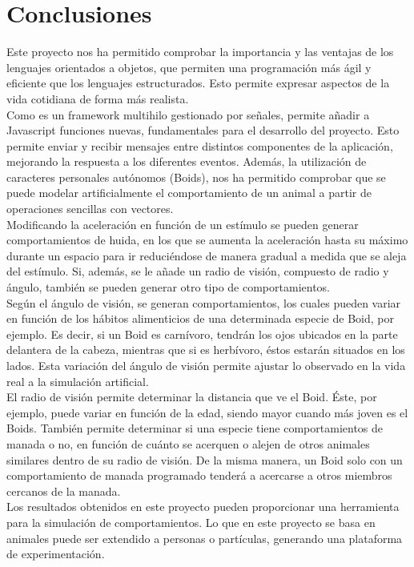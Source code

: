 \section{Conclusiones}
\label{chap:conclusiones}

Este proyecto nos ha permitido comprobar la importancia y las ventajas de los lenguajes orientados a objetos, que permiten una programación más 
ágil y eficiente que los lenguajes estructurados. Esto permite expresar aspectos de la vida cotidiana de forma más realista.\\

Como \lluvia{} es un framework multihilo gestionado por señales, permite añadir a Javascript funciones nuevas, fundamentales para el desarrollo del proyecto. 
Esto permite enviar y recibir mensajes entre distintos componentes de la aplicación, mejorando la respuesta a los diferentes eventos. Además, la utilización de caracteres 
personales autónomos (Boids), nos ha permitido comprobar que se puede modelar artificialmente el comportamiento de un animal a partir de 
operaciones sencillas con vectores.\\

Modificando la aceleración en función de un estímulo se pueden generar comportamientos de huida, en los que se aumenta la aceleración hasta su 
máximo durante un espacio para ir reduciéndose de manera gradual a medida que se aleja del estímulo.
Si, además, se le añade un radio de visión, compuesto de radio y ángulo, también se pueden generar otro tipo de comportamientos.\\

Según el ángulo de visión, se generan comportamientos, los cuales pueden variar en función de los hábitos alimenticios de 
una determinada especie de Boid, por ejemplo. Es decir, si un Boid es carnívoro, tendrán los ojos ubicados en la parte delantera de la cabeza, mientras 
que si es herbívoro, éstos estarán situados en los lados. Esta variación del ángulo de visión permite ajustar lo observado en la vida real a la 
simulación artificial.\\

El radio de visión permite determinar la distancia que ve el Boid. Éste, por ejemplo, puede variar en función de la edad, siendo mayor cuando
más joven es el Boids. También permite determinar si una especie tiene comportamientos de manada o no, en función de cuánto se acerquen o alejen de 
otros animales similares dentro de su radio de visión. De la misma manera, un Boid solo con un comportamiento de manada programado tenderá a 
acercarse a otros miembros cercanos de la manada.\\


Los resultados obtenidos en este proyecto pueden proporcionar una herramienta para la simulación de comportamientos. Lo que en este proyecto 
se basa en animales puede ser extendido a personas o partículas, generando una plataforma de experimentación.